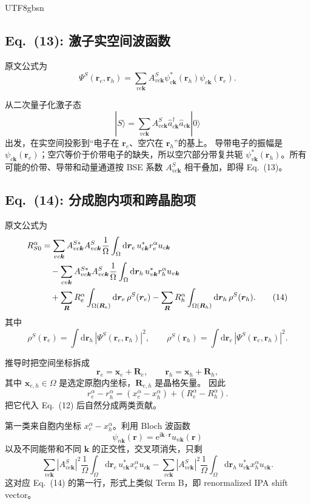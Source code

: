 \documentclass[11pt,a4paper]{article}
\newcommand{\dd}{\mathrm{d}}
\newcommand{\ii}{\mathrm{i}}
\newcommand{\ee}{\mathrm{e}}
\begin{document}
\begin{CJK}{UTF8}{gbsn}
\subsection*{Eq.~(13): 激子实空间波函数}

原文公式为
\begin{equation}
\Psi^S(\bm r_e,\bm r_h)
=\sum_{vc\bm k}
A^S_{vc\bm k}
\psi^*_{v\bm k}(\bm r_h)
\psi_{c\bm k}(\bm r_e).
\tag{13}
\end{equation}

从二次量子化激子态
\[
|S\rangle=\sum_{vc\bm k}A^S_{vc\bm k}
\hat a^\dagger_{c\bm k}\hat a_{v\bm k}|0\rangle
\]
出发，在实空间投影到``电子在 $\bm r_e$、空穴在 $\bm r_h$''的基上。
导带电子的振幅是 $\psi_{c\bm k}(\bm r_e)$；空穴等价于价带电子的缺失，所以空穴部分带复共轭
$\psi^*_{v\bm k}(\bm r_h)$。所有可能的价带、导带和动量通道按 BSE 系数
$A^S_{vc\bm k}$ 相干叠加，即得 Eq.~(13)。

\subsection*{Eq.~(14): 分成胞内项和跨晶胞项}

原文公式为
\begin{align}
R^\alpha_{S0}
&=
\sum_{vc\bm k}A^{S*}_{vc\bm k}A^S_{vc\bm k}
\frac{1}{\Omega}
\int_\Omega \dd\bm r_e\,
u^*_{c\bm k}r^\alpha_eu_{c\bm k}
\notag\\
&\quad
-
\sum_{cv\bm k}A^{S*}_{vc\bm k}A^S_{vc\bm k}
\frac{1}{\Omega}
\int_\Omega \dd\bm r_h\,
u^*_{v\bm k}r^\alpha_hu_{v\bm k}
\notag\\
&\quad
+\sum_{\bm R}R^\alpha_e
\int_{\Omega(\bm R_e)}\dd\bm r_e\,\rho^S(\bm r_e)
-
\sum_{\bm R}R^\alpha_h
\int_{\Omega(\bm R_h)}\dd\bm r_h\,\rho^S(\bm r_h).
\tag{14}
\end{align}
其中
\[
\rho^S(\bm r_e)=\int \dd\bm r_h\,|\Psi^S(\bm r_e,\bm r_h)|^2,
\qquad
\rho^S(\bm r_h)=\int \dd\bm r_e\,|\Psi^S(\bm r_e,\bm r_h)|^2.
\]

推导时把空间坐标拆成
\[
\bm r_e=\bm x_e+\bm R_e,\qquad
\bm r_h=\bm x_h+\bm R_h,
\]
其中 $\bm x_{e,h}\in\Omega$ 是选定原胞内坐标，$\bm R_{e,h}$ 是晶格矢量。
因此
\[
r^\alpha_e-r^\alpha_h
=(x^\alpha_e-x^\alpha_h)+(R^\alpha_e-R^\alpha_h).
\]
把它代入 Eq.~(12) 后自然分成两类贡献。

第一类来自胞内坐标 $x^\alpha_e-x^\alpha_h$。利用 Bloch 波函数
\[
\psi_{n\bm k}(\bm r)
=\ee^{\ii\bm k\cdot\bm r}u_{n\bm k}(\bm r)
\]
以及不同能带和不同 $\bm k$ 的正交性，交叉项消失，只剩
\[
\sum_{vc\bm k}|A^S_{vc\bm k}|^2
\frac{1}{\Omega}\int_\Omega \dd\bm r_e\,
u^*_{c\bm k}x^\alpha_eu_{c\bm k}
-
\sum_{vc\bm k}|A^S_{vc\bm k}|^2
\frac{1}{\Omega}\int_\Omega \dd\bm r_h\,
u^*_{v\bm k}x^\alpha_hu_{v\bm k}.
\]
这对应 Eq.~(14) 的第一行，形式上类似 Term B，即 renormalized IPA shift vector。


\end{CJK}
\end{document}
